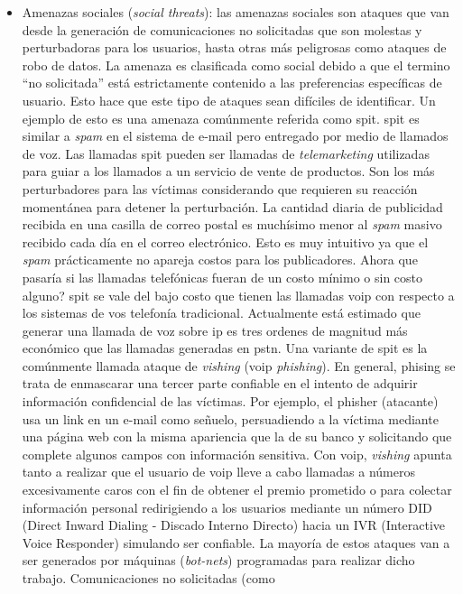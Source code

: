 \documentclass[a4paper,12pt]{report}
\begin{document}
\begin{itemize}
\item Amenazas sociales (\emph{social threats}): 
las amenazas sociales son ataques que van desde la generación de comunicaciones no solicitadas que son
molestas y perturbadoras para los usuarios, hasta otras más peligrosas como
ataques de robo de datos. La amenaza es clasificada como social debido a que el
termino ``no solicitada'' está estrictamente contenido a las preferencias
específicas de usuario. Esto hace que este tipo de ataques sean difíciles de
identificar.
Un ejemplo de esto es una amenaza comúnmente referida como \ac{spit}. 
\ac{spit} es similar a \emph{spam} en el sistema de e-mail pero entregado 
por medio de llamados de voz. Las llamadas \ac{spit} pueden ser llamadas de
\emph{telemarketing} utilizadas para guiar a los llamados a un servicio de vente de
productos. Son los más perturbadores para las víctimas considerando que
requieren su reacción momentánea para detener la perturbación.
La cantidad diaria de publicidad recibida en una casilla de correo postal es
muchísimo menor al \emph{spam} masivo recibido cada día en el correo electrónico. Esto
es muy intuitivo ya que el \emph{spam} prácticamente no apareja costos para los
publicadores. Ahora que pasaría si las llamadas telefónicas fueran de un costo
mínimo o sin costo alguno? \ac{spit} se vale del bajo costo que tienen las llamadas
\ac{voip} con respecto a los sistemas de vos telefonía tradicional. Actualmente está
estimado que generar una llamada de voz sobre \ac{ip} es tres ordenes de magnitud
más económico que las llamadas generadas en \ac{pstn}.
Una variante de \ac{spit} es la comúnmente llamada ataque de \emph{vishing} (\ac{voip}
\emph{phishing}). En general, phising se trata de enmascarar una tercer parte
confiable en el intento de adquirir información confidencial de las víctimas.
Por ejemplo, el phisher (atacante) usa un link en un e-mail como señuelo,
persuadiendo a la víctima mediante una página web con la misma apariencia que
la de su banco y solicitando que complete algunos campos con información
sensitiva. Con \ac{voip}, \emph{vishing} apunta tanto a realizar que el usuario de \ac{voip}
lleve a cabo llamadas a números excesivamente caros con el fin de obtener el
premio prometido o para colectar información personal redirigiendo a los
usuarios mediante un número DID (Direct Inward Dialing - Discado Interno
Directo) hacia un IVR (Interactive Voice Responder) simulando ser confiable. 
La mayoría de estos ataques van a ser generados por máquinas (\emph{bot-nets})
programadas para realizar dicho trabajo. Comunicaciones no solicitadas (como

\end{itemize}
\end{document}
